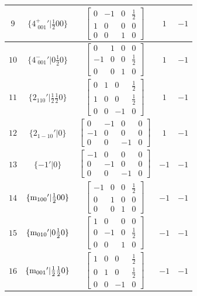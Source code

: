 \documentclass[fleqn,8pt]{jsarticle}
\begin{document}
\begin{longtable}{ccccc}
$ 9 $ & $ \{4^{+}_{\,\,001}{}'|\frac{1}{2} 0 0\} $ & $ \begin{bmatrix} 0 & -1 & 0 & \frac{1}{2} \\ 1 & 0 & 0 & 0 \\ 0 & 0 & 1 & 0 \end{bmatrix} $ & $ 1 $ & $ -1 $ \\ \hline
$ 10 $ & $ \{4^{-}_{\,\,001}{}'|0 \frac{1}{2} 0\} $ & $ \begin{bmatrix} 0 & 1 & 0 & 0 \\ -1 & 0 & 0 & \frac{1}{2} \\ 0 & 0 & 1 & 0 \end{bmatrix} $ & $ 1 $ & $ -1 $ \\ \hline
$ 11 $ & $ \{2{}_{110}{}'|\frac{1}{2} \frac{1}{2} 0\} $ & $ \begin{bmatrix} 0 & 1 & 0 & \frac{1}{2} \\ 1 & 0 & 0 & \frac{1}{2} \\ 0 & 0 & -1 & 0 \end{bmatrix} $ & $ 1 $ & $ -1 $ \\ \hline
$ 12 $ & $ \{2{}_{1-10}{}'|0\} $ & $ \begin{bmatrix} 0 & -1 & 0 & 0 \\ -1 & 0 & 0 & 0 \\ 0 & 0 & -1 & 0 \end{bmatrix} $ & $ 1 $ & $ -1 $ \\ \hline
$ 13 $ & $ \{-1{}'|0\} $ & $ \begin{bmatrix} -1 & 0 & 0 & 0 \\ 0 & -1 & 0 & 0 \\ 0 & 0 & -1 & 0 \end{bmatrix} $ & $ -1 $ & $ -1 $ \\ \hline
$ 14 $ & $ \{{\rm m}_{100}{}'|\frac{1}{2} 0 0\} $ & $ \begin{bmatrix} -1 & 0 & 0 & \frac{1}{2} \\ 0 & 1 & 0 & 0 \\ 0 & 0 & 1 & 0 \end{bmatrix} $ & $ -1 $ & $ -1 $ \\ \hline
$ 15 $ & $ \{{\rm m}_{010}{}'|0 \frac{1}{2} 0\} $ & $ \begin{bmatrix} 1 & 0 & 0 & 0 \\ 0 & -1 & 0 & \frac{1}{2} \\ 0 & 0 & 1 & 0 \end{bmatrix} $ & $ -1 $ & $ -1 $ \\ \hline
$ 16 $ & $ \{{\rm m}_{001}{}'|\frac{1}{2} \frac{1}{2} 0\} $ & $ \begin{bmatrix} 1 & 0 & 0 & \frac{1}{2} \\ 0 & 1 & 0 & \frac{1}{2} \\ 0 & 0 & -1 & 0 \end{bmatrix} $ & $ -1 $ & $ -1 $ \\
\end{longtable}
\end{document}
